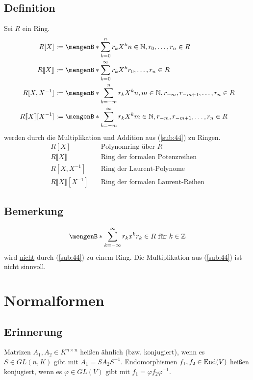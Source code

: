\subsection[Definition Polynomring etc.]{Definition} %
\label{sub:421}
Sei $R$ ein Ring.
\begin{align*}
	R[X] &:= \set[\sum_{k=0}^{n} r_k X^k ]{n \in \mathds{N} , r_0, \ldots , r_n \in R} \\
	R\llbracket X \rrbracket &:= \set[\sum_{k=0}^{\infty} r_k X^k ]{ r_0, \ldots , r_n \in R} \\
	R[X,X ^{-1}] &:= \set[\sum_{k=-m}^{n} r_k X^k ]{n,m \in \mathds{N} , r_{-m}, r_{-m+1}, \ldots , r_n \in R} \\
	R\llbracket X\rrbracket[X ^{-1}] &:= \set[\sum_{k=-m}^{\infty} r_k X^k ]{m \in \mathds{N} , r_{-m}, r_{-m+1}, \ldots , r_n \in R} 
\end{align*}
werden durch die Multiplikation und Addition aus (\ref{sub:44}) zu Ringen.
\[
\begin{array}{ll}
	R[X] \quad &\text{Polynomring über }R \\
	R\llbracket X\rrbracket \quad &\text{Ring der formalen Potenzreihen} \\
	R[X,X ^{-1}] \quad &\text{Ring der Laurent-Polynome} \\
	R\llbracket X\rrbracket [X ^{-1}] \quad &\text{Ring der formalen Laurent-Reihen} 
\end{array}
\]

\subsection[Bemerkung zu einer Definition, die nicht zu einem Ring wird]{Bemerkung} %
\label{sub:422}
\[
	\set[\sum_{k=- \infty}^{\infty} r_k x^k ]{r_k \in R \text{ für } k \in \mathds{Z}} 
\]
wird \uline{nicht} durch (\ref{sub:44}) zu einem Ring. Die Multiplikation aus (\ref{sub:44}) ist nicht sinnvoll.
\newpage

\section{Normalformen} %
\label{sec:normalformen}

\subsection[Erinnerung an konjugierte Matrizen und Endomorphismen]{Erinnerung} %
\label{sub:51}
Matrizen $A_1, A_2 \in K^{n \times n}$ heißen ähnlich (bzw. konjugiert), wenn es $S \in GL(n,K)$ gibt mit $A_1 = S A_2 S ^{-1}$. Endomorphismen $f_1, f_2 \in \operatorname{End}(V)$
heißen konjugiert, wenn es $\varphi \in GL(V)$ gibt mit $f_1 = \varphi f_2 \varphi ^{-1}$.


